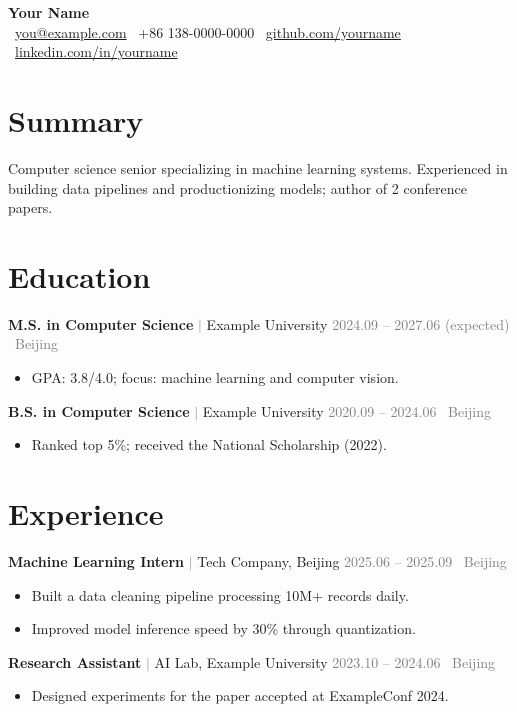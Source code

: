 \documentclass[10pt, a4paper]{article}
\newcommand{\entry}[4]{%
  \textbf{#1} \textcolor{graytext}{$\vert$} #2
  \hfill \textcolor{graytext}{#3 \, #4}\par
  \vspace{0.15em}
}
\begin{document}
\begin{center}
  {\Huge\bfseries\color{primary} Your Name}\\[0.6em]
  \faEnvelope\ \href{mailto:you@example.com}{you@example.com} \quad
  \faPhone\ +86 138-0000-0000 \quad
  \faGithub\ \href{https://github.com/yourname}{github.com/yourname} \quad
  \faLinkedin\ \href{https://linkedin.com/in/yourname}{linkedin.com/in/yourname}
\end{center}
\vspace{-0.4em}

\section{Summary}
Computer science senior specializing in machine learning systems.
Experienced in building data pipelines and productionizing models;
author of 2 conference papers.

\section{Education}
\entry{M.S. in Computer Science}{Example University}{2024.09 -- 2027.06 (expected)}{Beijing}
\begin{itemize}
  \item GPA: 3.8/4.0; focus: machine learning and computer vision.
\end{itemize}
\entry{B.S. in Computer Science}{Example University}{2020.09 -- 2024.06}{Beijing}
\begin{itemize}
  \item Ranked top 5\%; received the National Scholarship (2022).
\end{itemize}

\section{Experience}
\entry{Machine Learning Intern}{Tech Company, Beijing}{2025.06 -- 2025.09}{Beijing}
\begin{itemize}
  \item Built a data cleaning pipeline processing 10M+ records daily.
  \item Improved model inference speed by 30\% through quantization.
\end{itemize}
\entry{Research Assistant}{AI Lab, Example University}{2023.10 -- 2024.06}{Beijing}
\begin{itemize}
  \item Designed experiments for the paper accepted at ExampleConf 2024.
\end{itemize}
\end{document}
